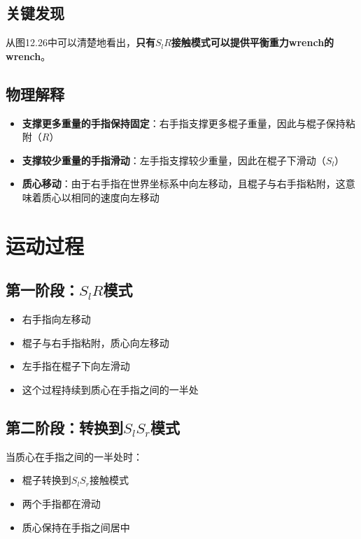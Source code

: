 \documentclass[12pt,a4paper]{article}
\begin{document}
\subsection{关键发现}

从图12.26中可以清楚地看出，\textbf{只有$S_lR$接触模式可以提供平衡重力wrench的wrench}。

\subsection{物理解释}

\begin{itemize}
    \item \textbf{支撑更多重量的手指保持固定}：右手指支撑更多棍子重量，因此与棍子保持粘附（$R$）
    \item \textbf{支撑较少重量的手指滑动}：左手指支撑较少重量，因此在棍子下滑动（$S_l$）
    \item \textbf{质心移动}：由于右手指在世界坐标系中向左移动，且棍子与右手指粘附，这意味着质心以相同的速度向左移动
\end{itemize}

\section{运动过程}

\subsection{第一阶段：$S_lR$模式}

\begin{itemize}
    \item 右手指向左移动
    \item 棍子与右手指粘附，质心向左移动
    \item 左手指在棍子下向左滑动
    \item 这个过程持续到质心在手指之间的一半处
\end{itemize}

\subsection{第二阶段：转换到$S_lS_r$模式}

当质心在手指之间的一半处时：
\begin{itemize}
    \item 棍子转换到$S_lS_r$接触模式
    \item 两个手指都在滑动
    \item 质心保持在手指之间居中
\end{itemize}
\end{document}
